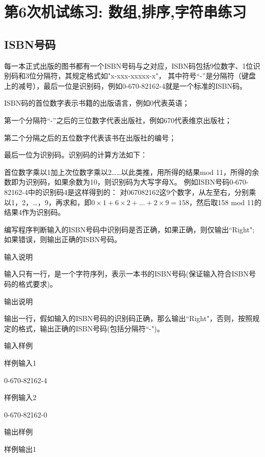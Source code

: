 %
%
%
\chapter{第6次机试练习: 数组,排序,字符串练习}

\section{ISBN号码}
每一本正式出版的图书都有一个ISBN号码与之对应，ISBN码包括9位数字、1位识别码和3位分隔符，其规定格式如"x-xxx-xxxxx-x"，
其中符号“-”是分隔符（键盘上的减号），最后一位是识别码，例如0-670-82162-4就是一个标准的ISBN码。

ISBN码的首位数字表示书籍的出版语言，例如0代表英语；

第一个分隔符“-”之后的三位数字代表出版社，例如670代表维京出版社；

第二个分隔之后的五位数字代表该书在出版社的编号；

最后一位为识别码。识别码的计算方法如下：

首位数字乘以1加上次位数字乘以2……以此类推，用所得的结果mod 11，所得的余数即为识别码，如果余数为10，则识别码为大写字母X。
例如ISBN号码0-670-82162-4中的识别码4是这样得到的：
对067082162这9个数字，从左至右，分别乘以1，2，\dots，9，再求和，即$0\times 1+6\times 2+\dots +2\times 9=158$，然后取158 mod 11的结果4作为识别码。

编写程序判断输入的ISBN号码中识别码是否正确，如果正确，则仅输出``Right"; 如果错误，则输出正确的ISBN号码。

输入说明	

输入只有一行，是一个字符序列，表示一本书的ISBN号码(保证输入符合ISBN号码的格式要求)。

输出说明	

输出一行，假如输入的ISBN号码的识别码正确，那么输出``Right"，否则，按照规定的格式，输出正确的ISBN号码(包括分隔符``-")。

输入样例	

样例输入1

0-670-82162-4

样例输入2

0-670-82162-0

输出样例	

样例输出1

